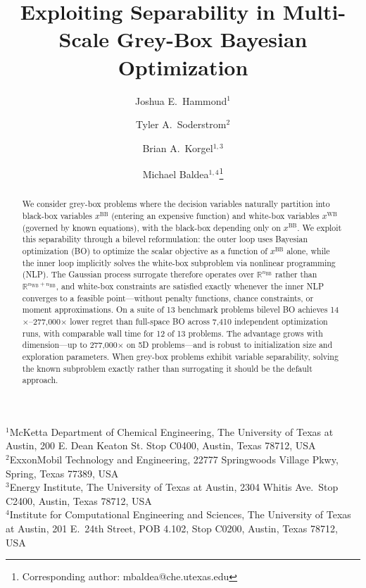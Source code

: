 \documentclass[12pt,a4paper]{article}%
\theoremstyle{plain}%
\theoremstyle{remark}%
\theoremstyle{definition}%
\def\WB{\mathrm{WB}}
\def\BB{\mathrm{BB}}
\begin{document}
\title{Exploiting Separability in Multi-Scale Grey-Box Bayesian Optimization}

\author{Joshua E.\ Hammond$^{1}$ \and Tyler A.\ Soderstrom$^{2}$ \and Brian A.\ Korgel$^{1,3}$ \and Michael Baldea$^{1,4}$\thanks{Corresponding author: mbaldea@che.utexas.edu}}

\date{}

\maketitle

\noindent$^{1}$McKetta Department of Chemical Engineering, The University of Texas at Austin, 200 E. Dean Keaton St. Stop C0400, Austin, Texas 78712, USA\\
$^{2}$ExxonMobil Technology and Engineering, 22777 Springwoods Village Pkwy, Spring, Texas 77389, USA\\
$^{3}$Energy Institute, The University of Texas at Austin, 2304 Whitis Ave.\ Stop C2400, Austin, Texas 78712, USA\\
$^{4}$Institute for Computational Engineering and Sciences, The University of Texas at Austin, 201 E.\ 24th Street, POB 4.102, Stop C0200, Austin, Texas 78712, USA

\bigskip

\begin{abstract}
We consider grey-box problems where the decision variables naturally partition into black-box variables $x^{\BB}$ (entering an expensive function) and white-box variables $x^{\WB}$ (governed by known equations), with the black-box depending only on $x^{\BB}$. We exploit this separability through a bilevel reformulation: the outer loop uses Bayesian optimization (BO) to optimize the scalar objective as a function of $x^{\BB}$ alone, while the inner loop implicitly solves the white-box subproblem via nonlinear programming (NLP). The Gaussian process surrogate therefore operates over $\mathbb{R}^{n_{\BB}}$ rather than $\mathbb{R}^{n_{\WB}+n_{\BB}}$, and white-box constraints are satisfied exactly whenever the inner NLP converges to a feasible point---without penalty functions, chance constraints, or moment approximations. On a suite of 13 benchmark problems bilevel BO achieves 14$\times$--277{,}000$\times$ lower regret than full-space BO across 7{,}410 independent optimization runs, with comparable wall time for 12 of 13 problems. The advantage grows with dimension---up to 277{,}000$\times$ on 5D problems---and is robust to initialization size and exploration parameters. When grey-box problems exhibit variable separability, solving the known subproblem exactly rather than surrogating it should be the default approach.
\end{abstract}
\end{document}
